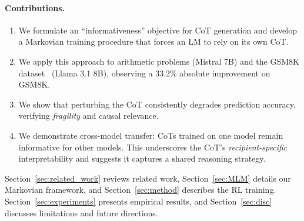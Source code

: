 \documentclass{article}
\theoremstyle{plain}
\theoremstyle{definition}
\theoremstyle{remark}
\begin{document}
\paragraph{Contributions.}
\begin{enumerate}
    \item We formulate an ``informativeness'' objective for CoT generation and develop a Markovian training procedure that forces an LM to rely on its own CoT.
    \item We apply this approach to arithmetic problems (Mistral 7B) and the GSM8K dataset~\citep{cobbe2021gsm8k} (Llama 3.1 8B), observing a 33.2\% absolute improvement on GSM8K.
    \item We show that perturbing the CoT consistently degrades prediction accuracy, verifying \emph{fragility} and causal relevance.
    \item We demonstrate cross-model transfer: CoTs trained on one model remain informative for other models. This underscores the CoT’s \emph{recipient-specific} interpretability and suggests it captures a shared reasoning strategy.
\end{enumerate}

Section~\ref{sec:related_work} reviews related work, Section~\ref{sec:MLM} details our Markovian framework, and Section~\ref{sec:method} describes the RL training. Section~\ref{sec:experiments} presents empirical results, and Section~\ref{sec:disc} discusses limitations and future directions.
\end{document}
